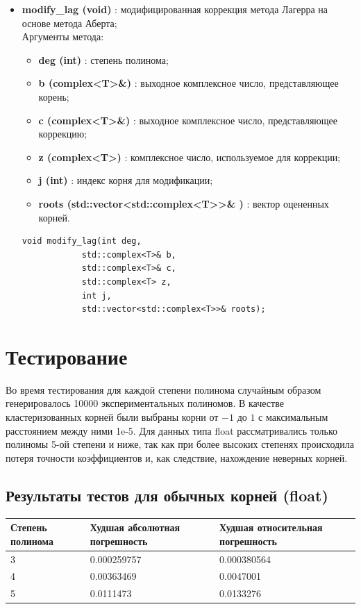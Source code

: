 \documentclass[a4paper,12pt]{article}
\begin{document}
\begin{itemize}
    \item \textbf{modify\_lag (void)} : модифицированная коррекция метода Лагерра на основе метода Аберта;
    \\Аргументы метода:
    \begin{itemize}
        \renewcommand{\labelitemi}{-}
        \item \textbf{deg (int)} : степень полинома;
        \item \textbf{b (complex<T>\&)} : выходное комплексное число, представляющее корень;
        \item \textbf{c (complex<T>\&)} : выходное комплексное число, представляющее коррекцию;
        \item \textbf{z (complex<T>)} : комплексное число, используемое для коррекции;
        \item \textbf{j (int)} : индекс корня для модификации;
        \item \textbf{roots (std::vector<std::complex<T>>\& )} : вектор оцененных корней.
    \end{itemize}
\begin{lstlisting}[language=С++]
void modify_lag(int deg, 
            std::complex<T>& b, 
            std::complex<T>& c, 
            std::complex<T> z, 
            int j, 
            std::vector<std::complex<T>>& roots); \end{lstlisting}
    
\end{itemize}

\newpage
\section{Тестирование}
Во время тестирования для каждой степени полинома случайным образом генерировалось 10000 экспериментальных полиномов. В качестве кластеризованных корней были выбраны корни от $-1$ до $1$ с максимальным расстоянием между ними 1e-5. Для данных типа float рассматривались только полиномы 5-ой степени и ниже, так как при более высоких степенях происходила потеря точности коэффициентов и, как следствие, нахождение неверных корней.

\subsection{Результаты тестов для обычных корней (float)}
\begin{center}
  \begin{tabular}{|p{4.5cm}|p{5.5cm}|p{5.5cm}|}
  \hline
  \textbf{Степень полинома}  &  \textbf{Худшая абсолютная погрешность} & \textbf{Худшая относительная погрешность} \\
  \hline
  3 & 0.000259757 & 0.000380564 \\
  \hline
  4 & 0.00363469 & 0.0047001 \\
  \hline
  5 & 0.0111473 & 0.0133276 \\
  \hline
\end{tabular}
\label{tab:my_label_2}
\end{center}
\end{document}
